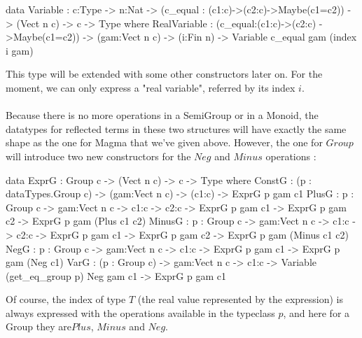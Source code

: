 \documentclass{sigplanconf}
\begin{document}
\begin{code}[caption=Reflected variables, captionpos=b, label=lst1:haskell2]  
data Variable : {c:Type} -> {n:Nat}
  -> (c_equal : (c1:c)->(c2:c)->Maybe(c1=c2)) 
  -> (Vect n c) -> c -> Type where
    RealVariable : (c_equal:(c1:c)->(c2:c)
                    ->Maybe(c1=c2))
          -> (gam:Vect n c) -> (i:Fin n) 
          -> Variable c_equal gam (index i gam) 
\end{code}	

This type will be extended with some other constructors later on. For the moment, we can only express a "real variable", referred by its index $i$. \\
\\
Because there is no more operations in a SemiGroup or in a Monoid, the datatypes for reflected terms in these two structures will have exactly the same shape as the one for Magma that we've given above.
However, the one for $Group$ will introduce two new constructors for the $Neg$ and $Minus$ operations :

\begin{code}[caption=Reflected terms in a Group, captionpos=b, label=lst1:haskell2]
data ExprG :  Group c -> (Vect n c) -> c -> 
              Type where
    ConstG : (p : dataTypes.Group c) 
      -> (gam:Vect n c)
      -> (c1:c) -> ExprG p gam c1
    PlusG : {p : Group c} -> {gam:Vect n c} 
      -> {c1:c} -> {c2:c} 
      -> ExprG p gam c1 
      -> ExprG p gam c2 
      -> ExprG p gam (Plus c1 c2)
    MinusG : {p : Group c} -> {gam:Vect n c} 
      -> {c1:c} -> {c2:c} 
      -> ExprG p gam c1 
      -> ExprG p gam c2 
      -> ExprG p gam (Minus c1 c2)
    NegG : {p : Group c} -> {gam:Vect n c} 
      -> {c1:c} -> ExprG p gam c1 
      -> ExprG p gam (Neg c1)
    VarG : (p : Group c) -> {gam:Vect n c} 
      -> {c1:c}
     -> Variable (get_eq_group p) Neg gam c1 
      -> ExprG p gam c1
\end{code}

Of course, the index of type $T$ (the real value represented by the expression) is always expressed with the operations available in the typeclass $p$, and here for a Group they are$Plus$, $Minus$ and $Neg$.
\end{document}
